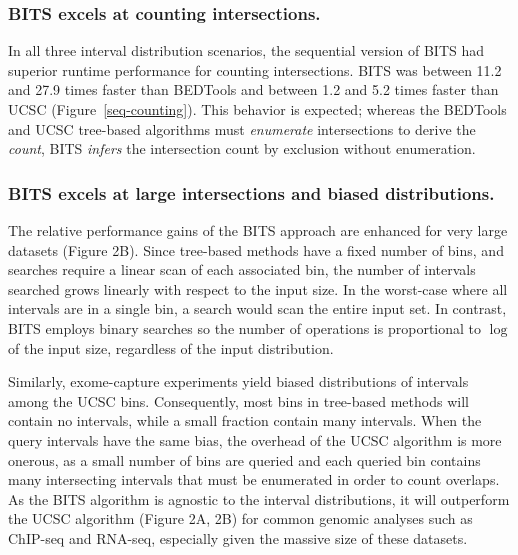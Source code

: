 \documentclass{bioinfo}
\begin{document}
\subsubsection{BITS excels at counting intersections.}

In all three interval distribution scenarios, the sequential version of BITS had
superior runtime performance for counting intersections.  BITS was between 11.2
and 27.9 times faster than BEDTools and between 1.2 and 5.2 times faster than
UCSC (Figure~\ref{seq-counting}). This behavior is expected; whereas the
BEDTools and UCSC tree-based algorithms must \emph{enumerate} intersections
to derive the \emph{count}, BITS \emph{infers} the intersection count by 
exclusion without enumeration.

\subsubsection{BITS excels at large intersections and biased distributions.}
The relative performance gains of the BITS approach are enhanced for very large
datasets (Figure 2B).  Since tree-based methods have a fixed number of bins, and 
searches require a linear scan of each associated bin,
the number of intervals searched grows linearly with respect to the input size.
In the worst-case where all intervals
are in a single bin, a search would scan the entire input set.  In contrast, 
BITS employs binary searches so the number of operations is proportional 
to $\log$ of the input size, regardless of the input distribution.


Similarly, exome-capture experiments yield biased distributions of intervals 
among the UCSC bins. Consequently, most bins in tree-based methods will contain 
no intervals, while a small fraction contain
many intervals. When the query intervals have the same bias, the overhead of the
UCSC algorithm is more onerous, as a small number of bins are queried and each
queried bin contains many intersecting intervals that must be enumerated in
order to count overlaps. As the BITS algorithm is agnostic to the interval
distributions, it will outperform the UCSC algorithm (Figure 2A, 2B) for common
genomic analyses such as ChIP-seq and RNA-seq, especially given the massive 
size of these datasets.
\end{document}
